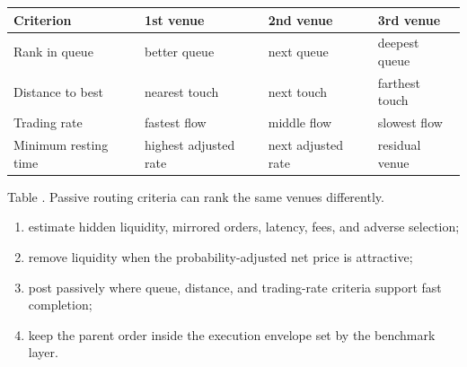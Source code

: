 \begin{table}[htbp]
\centering
\scriptsize
{}
\renewcommand{\arraystretch}{1.12}
\setlength{\tabcolsep}{4pt}
\begin{tabularx}{\textwidth}{@{}>{\RaggedRight\arraybackslash}p{} >{\RaggedRight\arraybackslash}p{} >{\RaggedRight\arraybackslash}p{} >{\RaggedRight\arraybackslash}X@{}}
\hline
\textbf{Criterion} & \textbf{1st venue} & \textbf{2nd venue} & \textbf{3rd venue} \\
\hline
Rank in queue & better queue & next queue & deepest queue \\
Distance to best & nearest touch & next touch & farthest touch \\
Trading rate & fastest flow & middle flow & slowest flow \\
Minimum resting time & highest adjusted rate & next adjusted rate & residual venue \\
\hline
\end{tabularx}

\vspace{0.25em}
{\footnotesize Table \thetable. Passive routing criteria can rank the same venues differently.}
\end{table}

\begin{process} 
\begin{enumerate}[label=\roman*.]
\setlength{\itemsep}{0pt}
\item estimate hidden liquidity, mirrored orders, latency, fees, and adverse selection;
\item remove liquidity when the probability-adjusted net price is attractive;
\item post passively where queue, distance, and trading-rate criteria support fast completion;
\item keep the parent order inside the execution envelope set by the benchmark layer.
\end{enumerate}
\end{process}
